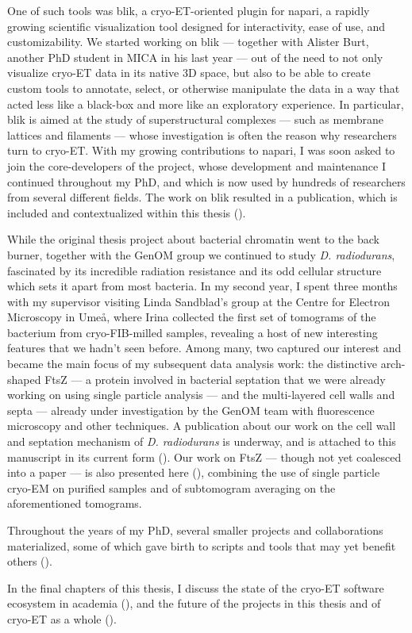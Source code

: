 One of such tools was blik, a cryo-ET-oriented plugin for napari, a rapidly growing scientific visualization tool designed for interactivity, ease of use, and customizability.
We started working on blik --- together with Alister Burt, another PhD student in MICA in his last year --- out of the need to not only visualize cryo-ET data in its native 3D space, but also to be able to create custom tools to annotate, select, or otherwise manipulate the data in a way that acted less like a black-box and more like an exploratory experience.
In particular, blik is aimed at the study of superstructural complexes --- such as membrane lattices and filaments --- whose investigation is often the reason why researchers turn to cryo-ET.
With my growing contributions to napari, I was soon asked to join the core-developers of the project, whose development and maintenance I continued throughout my PhD, and which is now used by hundreds of researchers from several different fields.
The work on blik resulted in a publication, which is included and contextualized within this thesis ().

While the original thesis project about bacterial chromatin went to the back burner, together with the GenOM group we continued to study \textit{D. radiodurans}, fascinated by its incredible radiation resistance and its odd cellular structure which sets it apart from most bacteria.
In my second year, I spent three months with my supervisor visiting Linda Sandblad's group at the Centre for Electron Microscopy in Umeå, where Irina collected the first set of tomograms of the bacterium from cryo-FIB-milled samples, revealing a host of new interesting features that we hadn't seen before.
Among many, two captured our interest and became the main focus of my subsequent data analysis work: the distinctive arch-shaped FtsZ --- a protein involved in bacterial septation that we were already working on using single particle analysis --- and the multi-layered cell walls and septa --- already under investigation by the GenOM team with fluorescence microscopy and other techniques.
A publication about our work on the cell wall and septation mechanism of \textit{D. radiodurans} is underway, and is attached to this manuscript in its current form ().
Our work on FtsZ --- though not yet coalesced into a paper --- is also presented here (), combining the use of single particle cryo-EM on purified samples and of subtomogram averaging on the aforementioned tomograms.

Throughout the years of my PhD, several smaller projects and collaborations materialized, some of which gave birth to scripts and tools that may yet benefit others ().

In the final chapters of this thesis, I discuss the state of the cryo-ET software ecosystem in academia (), and the future of the projects in this thesis and of cryo-ET as a whole ().
